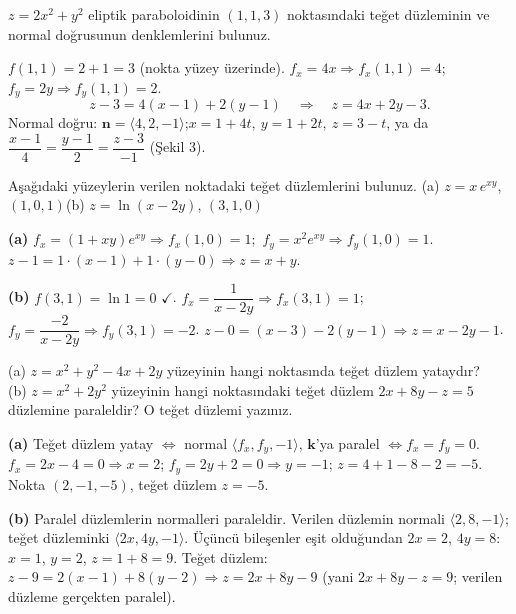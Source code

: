 \begin{soru}
$z=2x^2+y^2$ eliptik paraboloidinin $(1,1,3)$ noktasındaki teğet düzleminin ve normal doğrusunun denklemlerini bulunuz.
\end{soru}
\begin{cevap}
$f(1,1)=2+1=3$ (nokta yüzey üzerinde). $f_x=4x\Rightarrow f_x(1,1)=4$; $f_y=2y\Rightarrow f_y(1,1)=2$.
\[
z-3=4(x-1)+2(y-1)\quad\Longrightarrow\quad z=4x+2y-3 .
\]
Normal doğru: $\mathbf n=\langle4,2,-1\rangle$;\quad $x=1+4t,\ y=1+2t,\ z=3-t$, ya da
$\dfrac{x-1}{4}=\dfrac{y-1}{2}=\dfrac{z-3}{-1}$ (Şekil 3).
\end{cevap}

\begin{soru}
Aşağıdaki yüzeylerin verilen noktadaki teğet düzlemlerini bulunuz.\quad
(a) $z=x\,e^{xy}$, $(1,0,1)$\qquad (b) $z=\ln(x-2y)$, $(3,1,0)$
\end{soru}
\begin{cevap}
\textbf{(a)} $f_x=(1+xy)e^{xy}\Rightarrow f_x(1,0)=1$;\ $f_y=x^2e^{xy}\Rightarrow f_y(1,0)=1$.
$z-1=1\cdot(x-1)+1\cdot(y-0)\Rightarrow z=x+y$.

\textbf{(b)} $f(3,1)=\ln1=0$ $\checkmark$. $f_x=\dfrac{1}{x-2y}\Rightarrow f_x(3,1)=1$;\ $f_y=\dfrac{-2}{x-2y}\Rightarrow f_y(3,1)=-2$.
$z-0=(x-3)-2(y-1)\Rightarrow z=x-2y-1$.
\end{cevap}

\begin{soru}
(a) $z=x^2+y^2-4x+2y$ yüzeyinin hangi noktasında teğet düzlem yataydır?\\
(b) $z=x^2+2y^2$ yüzeyinin hangi noktasındaki teğet düzlem $2x+8y-z=5$ düzlemine paraleldir? O teğet düzlemi yazınız.
\end{soru}
\begin{cevap}
\textbf{(a)} Teğet düzlem yatay $\iff$ normal $\langle f_x,f_y,-1\rangle$, $\mathbf k$'ya paralel $\iff f_x=f_y=0$.
$f_x=2x-4=0\Rightarrow x=2$; $f_y=2y+2=0\Rightarrow y=-1$; $z=4+1-8-2=-5$. Nokta $(2,-1,-5)$, teğet düzlem $z=-5$.

\textbf{(b)} Paralel düzlemlerin normalleri paraleldir. Verilen düzlemin normali $\langle2,8,-1\rangle$; teğet düzleminki
$\langle2x,4y,-1\rangle$. Üçüncü bileşenler eşit olduğundan $2x=2$, $4y=8$: $x=1$, $y=2$, $z=1+8=9$.
Teğet düzlem: $z-9=2(x-1)+8(y-2)\Rightarrow z=2x+8y-9$ (yani $2x+8y-z=9$; verilen düzleme gerçekten paralel).
\end{cevap}

